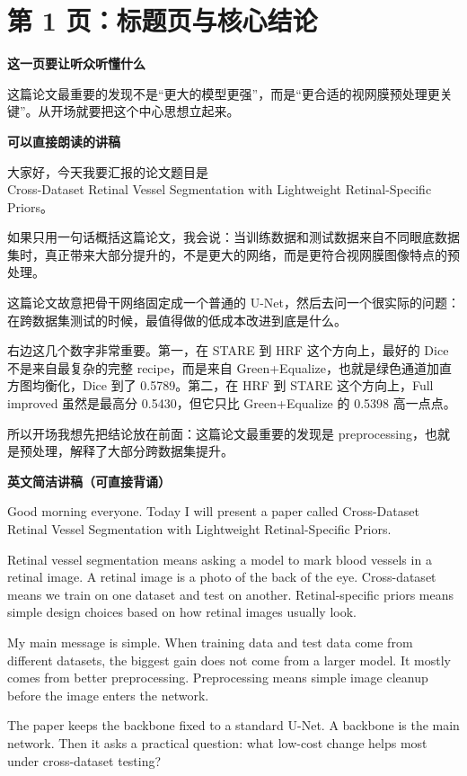 \documentclass[12pt,a4paper]{ctexart}
\newcommand{\EnglishScriptHeading}{\textbf{\color{AccentGreen}英文简洁讲稿（可直接背诵）}}
\begin{document}
\section*{第 1 页：标题页与核心结论}

\textbf{这一页要让听众听懂什么}

这篇论文最重要的发现不是“更大的模型更强”，而是“更合适的视网膜预处理更关键”。从开场就要把这个中心思想立起来。

\textbf{可以直接朗读的讲稿}

大家好，今天我要汇报的论文题目是\\
Cross-Dataset Retinal Vessel Segmentation with Lightweight Retinal-Specific Priors。

如果只用一句话概括这篇论文，我会说：当训练数据和测试数据来自不同眼底数据集时，真正带来大部分提升的，不是更大的网络，而是更符合视网膜图像特点的预处理。

这篇论文故意把骨干网络固定成一个普通的 U-Net，然后去问一个很实际的问题：在跨数据集测试的时候，最值得做的低成本改进到底是什么。

右边这几个数字非常重要。第一，在 STARE 到 HRF 这个方向上，最好的 Dice 不是来自最复杂的完整 recipe，而是来自 Green+Equalize，也就是绿色通道加直方图均衡化，Dice 到了 0.5789。第二，在 HRF 到 STARE 这个方向上，Full improved 虽然是最高分 0.5430，但它只比 Green+Equalize 的 0.5398 高一点点。

所以开场我想先把结论放在前面：这篇论文最重要的发现是 preprocessing，也就是预处理，解释了大部分跨数据集提升。

\EnglishScriptHeading

Good morning everyone. Today I will present a paper called Cross-Dataset Retinal Vessel Segmentation with Lightweight Retinal-Specific Priors.

Retinal vessel segmentation means asking a model to mark blood vessels in a retinal image. A retinal image is a photo of the back of the eye. Cross-dataset means we train on one dataset and test on another. Retinal-specific priors means simple design choices based on how retinal images usually look.

My main message is simple. When training data and test data come from different datasets, the biggest gain does not come from a larger model. It mostly comes from better preprocessing. Preprocessing means simple image cleanup before the image enters the network.

The paper keeps the backbone fixed to a standard U-Net. A backbone is the main network. Then it asks a practical question: what low-cost change helps most under cross-dataset testing?
\end{document}
